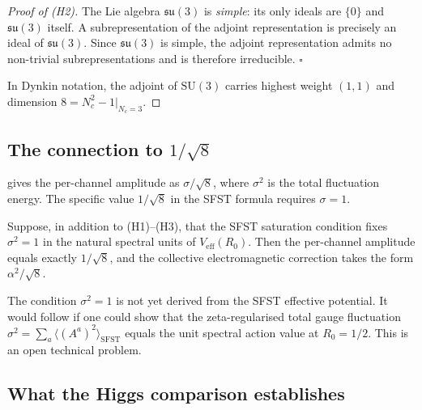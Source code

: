 \begin{proof}[Proof of (H2)]
The Lie algebra $\mathfrak{su}(3)$ is \emph{simple}: its only ideals are
$\{0\}$ and $\mathfrak{su}(3)$ itself.  A subrepresentation of the adjoint
representation is precisely an ideal of $\mathfrak{su}(3)$.  Since
$\mathfrak{su}(3)$ is simple, the adjoint representation admits no
non-trivial subrepresentations and is therefore irreducible.  $\square$

In Dynkin notation, the adjoint of $\mathrm{SU}(3)$ carries highest weight
$(1,1)$ and dimension $8 = N_c^2-1\big|_{N_c=3}$.
\end{proof}

\subsection{The connection to $1/\sqrt{8}$}

 gives the per-channel amplitude as $\sigma/\sqrt{8}$,
where $\sigma^2$ is the total fluctuation energy.  The specific value
$1/\sqrt{8}$ in the SFST formula requires $\sigma=1$.

\begin{proposition}
  \label{prop:sigma1}
  Suppose, in addition to \textup{(H1)--(H3)}, that the SFST saturation
  condition fixes $\sigma^2=1$ in the natural spectral units of
  $V_{\mathrm{eff}}(R_0)$.  Then the per-channel amplitude equals exactly
  $1/\sqrt{8}$, and the collective electromagnetic correction takes the form
  $\alpha^2/\sqrt{8}$.
\end{proposition}

The condition $\sigma^2=1$ is not yet derived from the SFST effective
potential.  It would follow if one could show that the zeta-regularised
total gauge fluctuation $\sigma^2 = \sum_a\langle(A^a)^2\rangle_{\mathrm{SFST}}$
equals the unit spectral action value at $R_0=1/2$.  This is an open
technical problem.

\subsection{What the Higgs comparison establishes}

